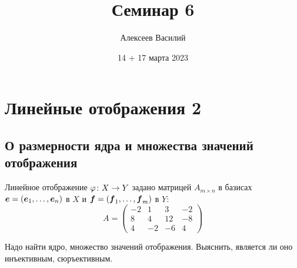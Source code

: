 \documentclass[a4paper,12pt]{article}
\author{Алексеев Василий}
\title{Семинар 6}
\date{14 + 17 марта 2023}
\begin{document}
  \maketitle
  
  \tableofcontents

  \thispagestyle{empty}
  
  \newpage
  


  \section{Линейные отображения 2}
  
  \subsection{О размерности ядра и множества значений отображения}
  
  Линейное отображение $\phi\colon X \hm\to Y$ задано матрицей $A_{m\times n}$ в базисах $\bds e \hm= (\bds e_1, \ldots, \bds e_n)$ в $X$ и $\bds f \hm= (\bds f_1, \ldots, \bds f_m)$ в $Y$:
  \[
    A = \begin{pmatrix}
      -2 & 1 & 3 & -2\\
      8 & 4 & 12 & -8\\
      4 & -2 & -6 & 4
    \end{pmatrix}
  \]
  
  Надо найти ядро, множество значений отображения.
  Выяснить, является ли оно инъективным, сюръективным.
  
\end{document}
